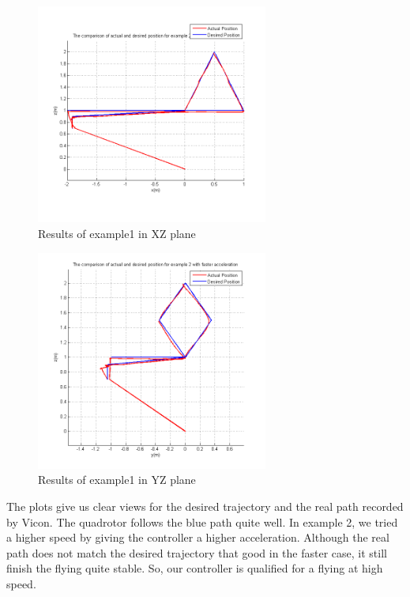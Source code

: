 \begin{figure}[H]
  \centering
  \includegraphics[width=3in]{Ex3_1_XZ.PNG}
  \caption{Results of example1 in XZ plane}
\end{figure}

\begin{figure}[H]
  \centering
  \includegraphics[width=3in]{Ex3_1_YZ.PNG}
  \caption{Results of example1 in YZ plane}
\end{figure}

The plots give us clear views for the desired trajectory and the real path recorded by Vicon. The quadrotor follows the blue path quite well. In example 2, we tried a higher speed by giving the controller a higher acceleration. Although the real path does not match the desired trajectory that good in the faster case, it still finish the flying quite stable. So, our controller is qualified for a flying at high speed.
